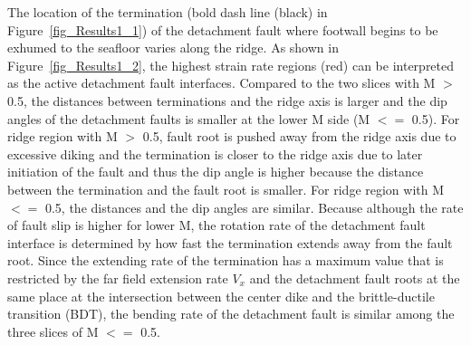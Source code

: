 The location of the termination (bold dash line (black) in Figure~\hyperref[fig_Results1_1]{\ref{fig_Results1_1}}) of the detachment fault where footwall begins to be exhumed to the seafloor varies along the ridge. As shown in Figure~\hyperref[fig_Results1_2]{\ref{fig_Results1_2}}, the highest strain rate regions (red) can be interpreted as the active detachment fault interfaces. Compared to the two slices with M $>$ 0.5, the distances between terminations and the ridge axis is larger and the dip angles of the detachment faults is smaller at the lower M side (M $<=$ 0.5). For ridge region with M $>$ 0.5, fault root is pushed away from the ridge axis due to excessive diking and the termination is closer to the ridge axis due to later initiation of the fault and thus the dip angle is higher because the distance between the termination and the fault root is smaller. For ridge region with M $<=$ 0.5, the distances and the dip angles are similar. Because although the rate of fault slip is higher for lower M, the rotation rate of the detachment fault interface is determined by how fast the termination extends away from the fault root. Since the extending rate of the termination has a maximum value that is restricted by the far field extension rate $V_{x}$ and the detachment fault roots at the same place at the intersection between the center dike and the brittle-ductile transition (BDT), the bending rate of the detachment fault is similar among the three slices of M $<=$ 0.5.  %
